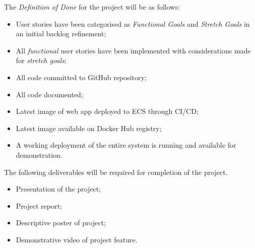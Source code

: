 	\noindent The \textit{Definition of Done} for the project  will be as follows:
	
	\begin{itemize}
		\item User stories have been categorised as \textit{Functional Goals} and \textit{Stretch Goals} in an initial backlog refinement;
		\item All \textit{functional} user stories have been implemented with considerations made for \textit{stretch goals};
		\item All code committed to GitHub repository;
		\item All code documented;
		\item Latest image of web app deployed to ECS through CI/CD;
		\item Latest image available on Docker Hub registry;
		\item A working deployment of the entire system is running and available for demonstration.
	\end{itemize}
	 
	 \noindent The following deliverables will be required for completion of the project. 
	 \begin{itemize}
	 	\item Presentation of the project;
	 	\item Project report;
	 	\item Descriptive poster of project;
	 	\item Demonstrative video of project feature.
	 \end{itemize}